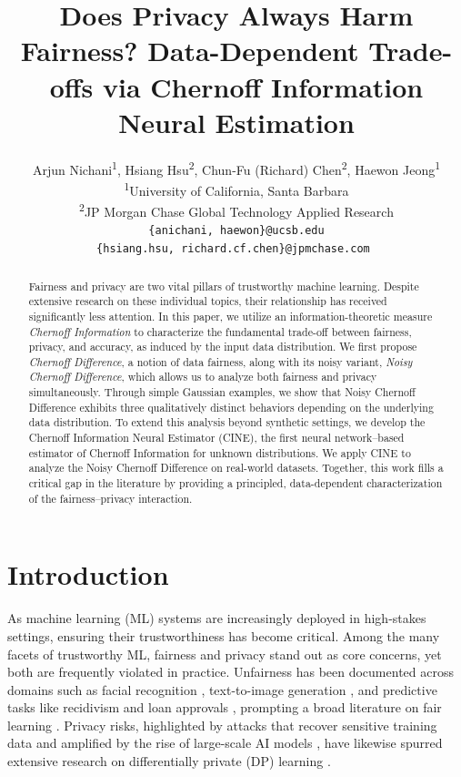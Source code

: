 \documentclass[11pt,letterpaper]{article}
\title{Does Privacy Always Harm Fairness? Data-Dependent Trade-offs via Chernoff Information Neural Estimation}
\author{Arjun Nichani\textsuperscript{1}, Hsiang Hsu\textsuperscript{2}, Chun-Fu (Richard)  Chen\textsuperscript{2}, Haewon Jeong\textsuperscript{1} \\
\textsuperscript{1}University of California, Santa Barbara\\
\textsuperscript{2}JP Morgan Chase Global Technology Applied Research\\
\texttt{\{anichani, haewon\}@ucsb.edu}\\
\texttt{\{hsiang.hsu, richard.cf.chen\}@jpmchase.com }
}
\begin{document}
\maketitle

\begin{abstract}
    Fairness and privacy are two vital pillars of trustworthy machine learning. Despite extensive research on these individual topics, their relationship has received significantly less attention. In this paper, we utilize an information-theoretic measure \textit{Chernoff Information} to characterize the fundamental trade-off between fairness, privacy, and accuracy, as induced by the input data distribution. We first propose \textit{Chernoff Difference}, a notion of data fairness, along with its noisy variant, \textit{Noisy Chernoff Difference}, which allows us to analyze both fairness and privacy simultaneously. Through simple Gaussian examples, we show that Noisy Chernoff Difference exhibits three qualitatively distinct behaviors depending on the underlying data distribution. To extend this analysis beyond synthetic settings, we develop the Chernoff Information Neural Estimator (CINE), the first neural network–based estimator of Chernoff Information for unknown distributions. We apply CINE to analyze the Noisy Chernoff Difference on real-world datasets. Together, this work fills a critical gap in the literature by providing a principled, data-dependent characterization of the fairness–privacy interaction.
\end{abstract}






\section{Introduction}\label{sec:intro}

As machine learning (ML) systems are increasingly deployed in high-stakes settings, ensuring their trustworthiness has become critical. 
Among the many facets of trustworthy ML, fairness and privacy stand out as core concerns, yet both are frequently violated in practice. 
Unfairness has been documented across domains such as facial recognition \citep{garvie2016facial}, text-to-image generation \citep{friedrich2023fairdiffusioninstructingtexttoimage, Bianchi_2023}, and predictive tasks like recidivism \citep{barocas2016big, chouldechova2016fairpredictiondisparateimpact} and loan approvals \citep{das2021fairness}, prompting a broad literature on fair learning \citep{hardt2016equality, agarwal2018reductions, alghamdi2022beyond}. 
Privacy risks, highlighted by attacks that recover sensitive training data \citep{shokri2017membership, carlini2021extracting} and amplified by the rise of large-scale AI models \citep{Gomstyn2024}, have likewise spurred extensive research on differentially private (DP) learning \citep{Abadi_2016, papernot2018scalable, kang2020inputperturbationnewparadigm}.
\end{document}
